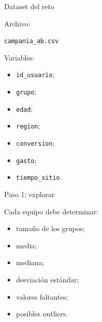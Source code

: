 \documentclass[aspectratio=169,11pt]{beamer}
\begin{document}

\begin{frame}{Dataset del reto}

Archivo:

\begin{center}

\texttt{campania\_ab.csv}

\end{center}

Variables:

\begin{itemize}

    \item \texttt{id\_usuario};

    \item \texttt{grupo};

    \item \texttt{edad};

    \item \texttt{region};

    \item \texttt{conversion};

    \item \texttt{gasto};

    \item \texttt{tiempo\_sitio}.

\end{itemize}

\end{frame}


\begin{frame}{Paso 1: explorar}

Cada equipo debe determinar:

\begin{itemize}

    \item tamaño de los grupos;

    \item media;

    \item mediana;

    \item desviación estándar;

    \item valores faltantes;

    \item posibles outliers.

\end{itemize}

\end{frame}
\end{document}
